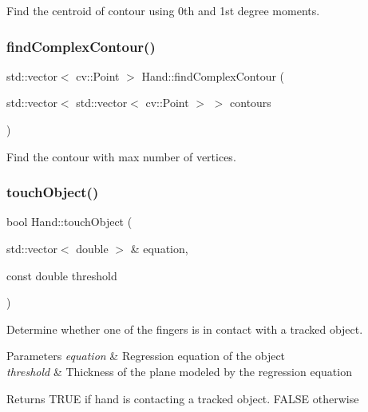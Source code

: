 Find the centroid of contour using 0th and 1st degree moments. 

\hypertarget{class_hand_a836fa2da6d128e2db7eca7e4965d0a2d}{}\label{class_hand_a836fa2da6d128e2db7eca7e4965d0a2d} 
\subsubsection{\texorpdfstring{find\+Complex\+Contour()}{findComplexContour()}}
{\footnotesize\ttfamily std\+::vector$<$ cv\+::\+Point $>$ Hand\+::find\+Complex\+Contour (\begin{DoxyParamCaption}\item[{std\+::vector$<$ std\+::vector$<$ cv\+::\+Point $>$ $>$}]{contours }\end{DoxyParamCaption})\hspace{0.3cm}{\ttfamily [private]}}



Find the contour with max number of vertices. 

\hypertarget{class_hand_aad89c3e47921cb0c39430f4501238088}{}\label{class_hand_aad89c3e47921cb0c39430f4501238088} 
\subsubsection{\texorpdfstring{touch\+Object()}{touchObject()}}
{\footnotesize\ttfamily bool Hand\+::touch\+Object (\begin{DoxyParamCaption}\item[{std\+::vector$<$ double $>$ \&}]{equation,  }\item[{const double}]{threshold }\end{DoxyParamCaption})}



Determine whether one of the fingers is in contact with a tracked object. 


\begin{DoxyParams}{Parameters}
{\em equation} & Regression equation of the object \\
\hline
{\em threshold} & Thickness of the plane modeled by the regression equation \\
\hline
\end{DoxyParams}
\begin{DoxyReturn}{Returns}
T\+R\+UE if hand is contacting a tracked object. F\+A\+L\+SE otherwise 
\end{DoxyReturn}


